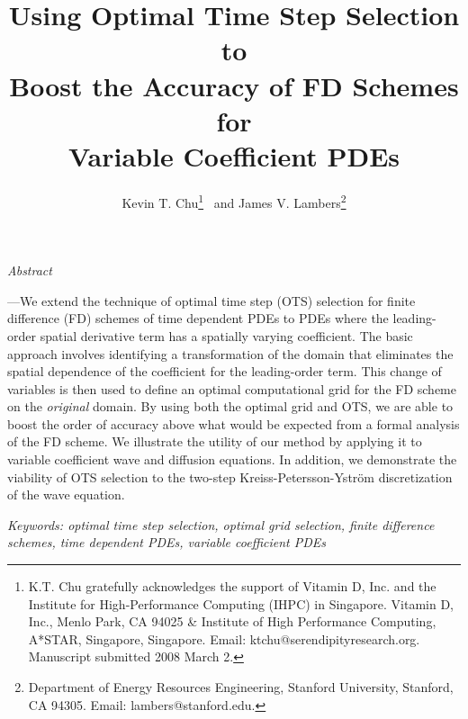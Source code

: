 \documentclass[twocolumn]{article} %
\begin{document}


\date{}

\title{\huge \bf {Using Optimal Time Step Selection to \\ 
       Boost the Accuracy of FD Schemes for \\
       Variable Coefficient PDEs }}

\author{Kevin T. Chu\thanks{
  K.T. Chu gratefully acknowledges the support of Vitamin D, Inc.
  and the Institute for High-Performance Computing (IHPC) in Singapore. 
  Vitamin D, Inc., Menlo Park, CA 94025 \& 
  Institute of High Performance Computing, A*STAR, Singapore, Singapore.
  Email: ktchu@serendipityresearch.org.
  Manuscript submitted 2008 March 2. 
 } 
 \ and
 James V. Lambers\thanks{Department of Energy Resources Engineering, 
 Stanford University, Stanford, CA 94305.  Email: lambers@stanford.edu.}
}

\maketitle
\thispagestyle{empty}

{\hspace{1pc} {\it{\small Abstract}}{\bf{\small---We extend the technique 
of optimal time step (OTS) selection for finite difference (FD) schemes of time 
dependent PDEs to PDEs where the leading-order spatial derivative term has a
spatially varying coefficient.  The basic approach involves identifying a 
transformation of the domain that eliminates the spatial dependence of the 
coefficient for the leading-order term.  This change of variables is then used 
to define an optimal computational grid for the FD scheme on the 
\emph{original} domain.   By using both the optimal grid and OTS, we are
able to boost the order of accuracy above what would be expected from a formal
analysis of the FD scheme.  We illustrate the utility of our method by 
applying it to variable coefficient wave and diffusion equations.  In 
addition, we demonstrate the viability of OTS selection to the two-step 
Kreiss-Petersson-Ystr\"om discretization of the wave equation.

\em Keywords: optimal time step selection, optimal grid selection, finite 
    difference schemes, time dependent PDEs, variable coefficient PDEs}}
 }
\end{document}
